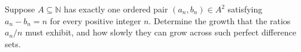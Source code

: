 Suppose $A\subseteq\mathbb N$ has exactly one ordered pair $(a_n,b_n)\in A^2$ satisfying $a_n-b_n=n$ for every positive integer $n$. Determine the growth that the ratios $a_n/n$ must exhibit, and how slowly they can grow across such perfect difference sets.
